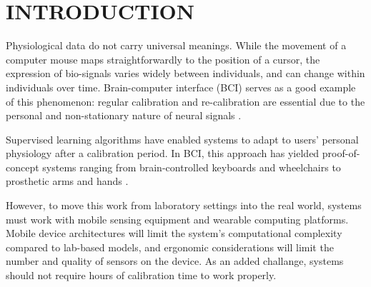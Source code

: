 \section{\uppercase{Introduction}}
\label{sec:introduction}

\noindent Physiological data do not carry universal meanings. While the movement of a computer mouse maps straightforwardly to the position of a cursor, the expression of bio-signals varies widely between individuals, and can change within individuals over time. Brain-computer interface (BCI) serves as a good example of this phenomenon: regular calibration and re-calibration are essential due to the personal and non-stationary nature of neural signals \cite{dornhege_toward_2007,mcfarland_brain-computer_2011}.

Supervised learning algorithms have enabled systems to adapt to users' personal physiology after a calibration period. In BCI, this approach has yielded proof-of-concept systems ranging from brain-controlled keyboards and wheelchairs to prosthetic arms and hands \cite{blankertz_note_2007,millan_combining_2010,d._mattia_brain_2011,hill_practical_2014,campbell_neurophone:_2010}. 



However, to move this work from laboratory settings into the real world, systems must work with mobile sensing equipment and wearable computing platforms. Mobile device architectures will limit the system's computational complexity compared to lab-based models, and ergonomic considerations will limit the number and quality of sensors on the device. As an added challange, systems should not require hours of calibration time to work properly.


